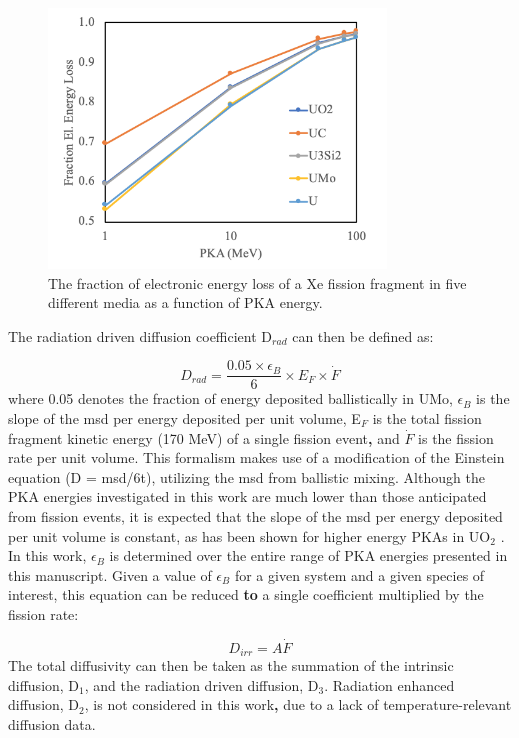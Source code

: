 \documentclass[review]{elsarticle}
\providecommand{\DIFaddtex}[1]{{\bf #1}} %
\providecommand{\DIFdeltex}[1]{} %
\providecommand{\DIFaddbegin}{\protect\color{blue}} %
\providecommand{\DIFaddend}{\protect\color{black}} %
\providecommand{\DIFdelbegin}{\protect\color{red}} %
\providecommand{\DIFdelend}{\protect\color{black}} %
\providecommand{\DIFadd}[1]{\texorpdfstring{\DIFaddtex{#1}}{#1}} %
\providecommand{\DIFdel}[1]{\texorpdfstring{\DIFdeltex{#1}}{}} %
\newcommand{\DIFscaledelfig}{0.5}
\newlength{\DIFdelgraphicswidth} %
\newlength{\DIFdelgraphicsheight} %
\newcommand{\DIFaddincludegraphics}[2][]{{\color{blue}\fbox{\DIFOincludegraphics[#1]{#2}}}} %
\newcommand{\DIFdelincludegraphics}[2][]{%
\sbox{\DIFdelgraphicsbox}{\DIFOincludegraphics[#1]{#2}}%
\settoboxwidth{\DIFdelgraphicswidth}{\DIFdelgraphicsbox} %
\settoboxtotalheight{\DIFdelgraphicsheight}{\DIFdelgraphicsbox} %
\scalebox{\DIFscaledelfig}{%
\parbox[b]{\DIFdelgraphicswidth}{\usebox{\DIFdelgraphicsbox}\\[-\baselineskip] \rule{\DIFdelgraphicswidth}{0em}}\llap{\resizebox{\DIFdelgraphicswidth}{\DIFdelgraphicsheight}{%
\setlength{\unitlength}{\DIFdelgraphicswidth}%
\begin{picture}(1,1)%
\thicklines\linethickness{2pt} %
{\color[rgb]{1,0,0}\put(0,0){\framebox(1,1){}}}%
{\color[rgb]{1,0,0}\put(0,0){\line( 1,1){1}}}%
{\color[rgb]{1,0,0}\put(0,1){\line(1,-1){1}}}%
\end{picture}%
}\hspace*{3pt}}} %
} %
\DeclareRobustCommand{\DIFaddbegin}{\DIFOaddbegin \let\includegraphics\DIFaddincludegraphics} %
\DeclareRobustCommand{\DIFaddend}{\DIFOaddend \let\includegraphics\DIFOincludegraphics} %
\DeclareRobustCommand{\DIFdelbegin}{\DIFOdelbegin \let\includegraphics\DIFdelincludegraphics} %
\DeclareRobustCommand{\DIFdelend}{\DIFOaddend \let\includegraphics\DIFOincludegraphics} %
\begin{document}
\begin{figure}[h]
 \centering
 \includegraphics[width=0.8\textwidth]{2_el_energy_loss.png} 
 \caption{The fraction of electronic energy loss of a Xe fission fragment in five different media as a function of PKA energy.}
 \label{fig:eloss}
\end{figure} 

The radiation driven diffusion coefficient D$_{rad}$ can then be defined as:

\begin{equation}
\label{eq:1}
D_{rad} = \frac{0.05 \times \epsilon_{B}}{6} \times E_{F} \times \dot F
\end{equation} where 0.05 denotes the fraction of energy deposited ballistically in UMo, $\epsilon_B$ is the slope of the msd per energy deposited per unit volume, E$_F$ is the total fission fragment kinetic energy (170 MeV) of a single fission event\DIFaddbegin \DIFadd{, }\DIFaddend and $\dot F$ is the fission rate per unit volume. This formalism makes use of a modification of the Einstein equation (D = msd/6t), utilizing the msd from ballistic mixing. Although the PKA energies investigated in this work are much lower than those anticipated from fission events, it is expected that the slope of the msd per energy deposited per unit volume is constant, as has been shown for higher energy PKAs in UO$_2$ \cite{cooper2016}. In this work, $\epsilon_B$ is determined over the entire range of PKA energies presented in this manuscript. Given a value of $\epsilon_B$ for a given system and a given species of interest, this equation can be reduced \DIFdelbegin \DIFdel{do }\DIFdelend \DIFaddbegin \DIFadd{to }\DIFaddend a single coefficient multiplied by the fission rate:

\begin{equation}
\label{eq:2}
D_{irr} = A \dot{F} 
\end{equation} The total diffusivity can then be taken as the summation of the intrinsic diffusion, D$_1$, and the radiation driven diffusion, D$_3$. Radiation enhanced diffusion, D$_2$, is not considered in this work\DIFaddbegin \DIFadd{, }\DIFaddend due to a lack of temperature-relevant diffusion data. 
\end{document}
